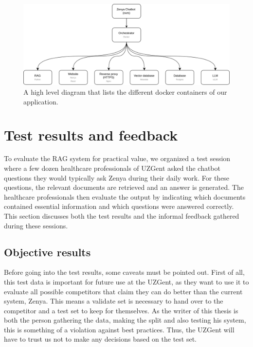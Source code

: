 \begin{figure}[H]
    \captionsetup{justification=centering}
    \centerline{\includegraphics[width=1\linewidth]{fig/Architecture Docker.png}}
    \caption{A high level diagram that lists the different docker containers of our application.}
    \label{fig:architecture_docker}
\end{figure}

\section{Test results and feedback}
\label{sec:uzgent_test_results_and_feedback}
To evaluate the RAG system for practical value, we organized a test session where a few dozen healthcare professionals of UZGent asked the chatbot questions they would typically ask Zenya during their daily work. For these questions, the relevant documents are retrieved and an answer is generated. The healthcare professionals then evaluate the output by indicating which documents contained essential information and which questions were answered correctly. This section discusses both the test results and the informal feedback gathered during these sessions.

\subsection{Objective results}
Before going into the test results, some caveats must be pointed out. First of all, this test data is important for future use at the UZGent, as they want to use it to evaluate all possible competitors that claim they can do better than the current system, Zenya. This means a validate set is necessary to hand over to the competitor and a test set to keep for themselves. As the writer of this thesis is both the person gathering the data, making the split and also testing his system, this is something of a violation against best practices. Thus, the UZGent will have to trust us not to make any decisions based on the test set.

